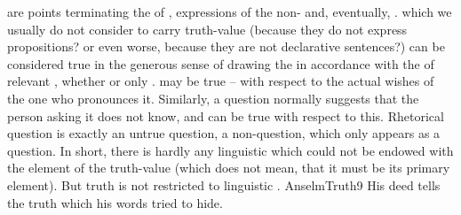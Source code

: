 \pa\label{pa:truthAll}  are  points terminating the
 of ,  expressions of the
non- and, eventually, .   which
we usually do not consider to carry truth-value (because they do not express
propositions? or even worse, because they are not declarative sentences?) can be
considered true in the generous sense of drawing the  in
accordance with the  of relevant , whether 
or only .   may be true -- with respect
to the actual wishes of
the one who pronounces it. Similarly, a question %
normally suggests that the person asking it does not know, and can
be true with respect to this. Rhetorical question is exactly an untrue question,
a non-question, which only appears as a question. In short, there is hardly any
linguistic  which could not be endowed with the element of the
truth-value (which does not mean, that it must be its primary element). But
truth is not restricted to linguistic . 
\citet{If you were in a place where you knew that there were both healthy and
  poisonous herbs, though you did not know how to distinguish between them, but
there was someone else there whom you did not doubt knew how to distinguish
them, and when you asked him he told you which were the healthy and which
poisonous, and he told you that some were healthy yet he himself ate others,
which would you believe, his word or his deed?}{AnselmTruth}{9} His deed tells
the truth which his words tried to hide. 


